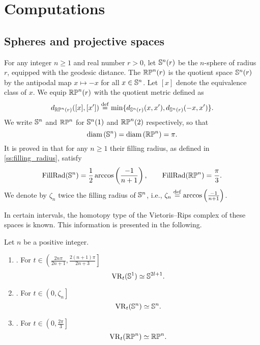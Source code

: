 
\section{Computations}\label{s:computations}

\subsection{Spheres and projective spaces}

For any integer $n \geq 1$ and real number $r > 0$, let $\mathbb{S}^n(r)$ be the $n$-sphere of radius $r$, equipped with the geodesic distance.
The  $\mathbb{RP}^n(r)$ is the quotient space $\mathbb{S}^n(r)$ by the antipodal map $x \mapsto -x$ for all $x \in \mathbb{S}^n$.
Let $[x]$ denote the equivalence class of $x$. We equip $\mathbb{RP}^n(r)$ with the quotient metric defined as
\[
d_{\mathbb{RP}^n(r)}([x],[x'])\stackrel{\mathrm{def}}{=}\min \{d_{\mathbb{S}^n(r)}(x,x'),d_{\mathbb{S}^n(r)}(-x,x')\}.
\]
We write $\mathbb{S}^n$ and $\mathbb{RP}^n$ for $\mathbb{S}^n(1)$ and $\mathbb{RP}^n(2)$ respectively, so that
\[
\operatorname{diam} \left(\mathbb{S}^n \right) = \operatorname{diam}\left(\mathbb{RP}^n \right) = \pi.
\]
It is proved in \cite{katz1983filling} that for any $n \geq 1$ their filling radius, as defined in \cref{ss:filling_radius}, satisfy
\[
\operatorname{FillRad}(\mathbb{S}^n) = \frac{1}{2}\arccos\left(\frac{-1}{n+1}\right), \qquad \operatorname{FillRad}(\mathbb{RP}^n)=\frac{\pi}{3}.
\]
We denote by $\zeta_n$ twice the filling radius of $\mathbb{S}^n$, i.e., $\zeta_n \stackrel{\mathrm{def}}{=} \arccos\left(\frac{-1}{n+1}\right)$.

In certain intervals, the homotopy type of the Vietoris--Rips complex of these spaces is known.
This information is presented in the following.

\begin{proposition}
	Let $n$ be a positive integer.
	\begin{enumerate}[{\rm (a)}]
		\item\label{prop:S1}{\rm \cite[Thm.~7.4]{adamaszek2017vietoris}.}
		For $t \in \left(\frac{2n\pi}{2n+1}, \frac{2(n+1)\pi}{2n+3}\right]$
		\[
		\operatorname{VR}_t(\mathbb{S}^1) \simeq \mathbb{S}^{2l+1}.
		\]

		\item\label{prop:Sn}{\rm \cite[Thm.~10]{lim2020vietoris}.}
		For $t \in \left(0, \zeta_n\right]$
		\[
		\operatorname{VR}_t(\mathbb{S}^n) \simeq \mathbb{S}^n.
		\]

		\item\label{prop:RPn}{\rm \cite[Thm.~4.5]{adams2022metric}.}
		For $t \in \left(0,\frac{2\pi}{3} \right]$
		\[
		\operatorname{VR}_t(\mathbb{RP}^n) \simeq \mathbb{RP}^n.
		\]
	\end{enumerate}
\end{proposition}

